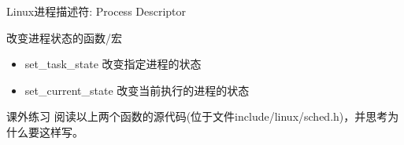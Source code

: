 \documentclass[xcolor=svgnames]{beamer}
\begin{document}
\begin{CJK*}{UTF8}{gbsn}
\begin{frame}{Linux进程描述符: Process Descriptor}
\begin{block}{改变进程状态的函数/宏}
\begin{itemize}
\item set\_task\_state 改变指定进程的状态
\item set\_current\_state 改变当前执行的进程的状态
\end{itemize}
\end{block}
\begin{block}{课外练习}
阅读以上两个函数的源代码(位于文件include/linux/sched.h)，并思考为什么要这样写。
\end{block}
\end{frame}


%

%


\end{CJK*}
\end{document}
